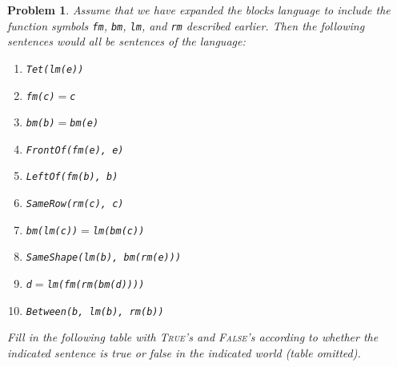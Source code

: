 \documentclass[12pt]{article}
\newtheorem{problem}{Problem}
\theoremstyle{remark}  %
\begin{document}
\setcounter{problem}{12}
    \begin{problem}
        Assume that we have expanded the blocks language to include the function symbols \texttt{fm}, \texttt{bm}, \texttt{lm}, and \texttt{rm} described earlier. Then the following sentences would all be sentences of the language:
        \begin{enumerate}
            \item \texttt{Tet(lm(e))}
            \item \texttt{fm(c)$=$c}
            \item \texttt{bm(b)$=$bm(e)}
            \item \texttt{FrontOf(fm(e), e)}
            \item \texttt{LeftOf(fm(b), b)}
            \item \texttt{SameRow(rm(c), c)}
            \item \texttt{bm(lm(c))$=$lm(bm(c))}
            \item \texttt{SameShape(lm(b), bm(rm(e)))}
            \item \texttt{d$=$lm(fm(rm(bm(d))))}
            \item \texttt{Between(b, lm(b), rm(b))}
        \end{enumerate}
        Fill in the following table with {\upshape \textsc{True}}'s and {\upshape \textsc{False}}'s according to whether the indicated sentence is true or false in the indicated world (table omitted).
    \end{problem}
\vspace{.5em}


\iffalse
\end{document}
